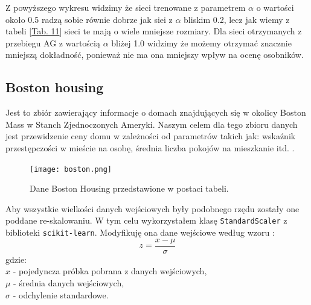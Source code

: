 \documentclass{article}
\begin{document}
Z powyższego wykresu widzimy że sieci trenowane z parametrem $\alpha$ o wartości około 0.5
radzą sobie równie dobrze jak siei z $\alpha$ bliskim 0.2, lecz jak wiemy z tabeli 
[\hyperref[tab:fmres]{Tab. 11}] sieci te mają o wiele mniejsze rozmiary. Dla sieci otrzymanych
z przebiegu AG z wartością $\alpha$ bliżej 1.0 widzimy że możemy otrzymać znacznie mniejszą
dokładność, ponieważ nie ma ona mniejszy wpływ na ocenę osobników.



\subsection{Boston housing}
Jest to zbiór zawierający informacje o domach znajdujących się w okolicy Boston Mass w Stanch
Zjednoczonych Ameryki. Naszym celem dla tego zbioru danych jest przewidzenie ceny
domu w zależności od parametrów takich jak: wskaźnik przestępczości w mieście na osobę, 
średnia liczba pokojów na mieszkanie itd. \cite{bh}.

\begin{figure}[H]
\centering
\texttt{[image: boston.png]}
\caption{Dane Boston Housing przedstawione w postaci tabeli. \cite{bh}}
\end{figure}

Aby wszystkie wielkości danych wejściowych były podobnego rzędu  zostały one poddane 
re-skalowaniu.
W tym celu wykorzystałem klasę \texttt{StandardScaler} z biblioteki \texttt{scikit-learn}.
Modyfikuję ona dane wejściowe według wzoru \cite{sklearn_api}:
\begin{equation}
	z = \frac{x - \mu}{\sigma}
\end{equation}
gdzie:\\
$x$ - pojedyncza próbka pobrana z danych wejściowych,\\
$\mu$ - średnia danych wejściowych,\\
$\sigma$ - odchylenie standardowe.\\
\end{document}
